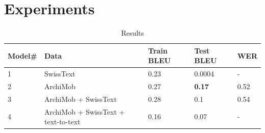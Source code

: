 \section{Experiments}
\begin{table}[!t]
    \centering
    \begin{tabular}{lllll}
    \hline\textbf{Model\#}    & \textbf{Data} & \textbf{Train BLEU}   & \textbf{Test BLEU}  & \textbf{WER}  \\\hline
    1                   & SwissText     & 0.23                  &  0.0004 & -              \\
    2                   & ArchiMob      & 0.27                  & \textbf{0.17}             & 0.52             \\
    3                   & ArchiMob + SwissText      & 0.28                  & 0.1                      & 0.54               \\
    4                   & ArchiMob + SwissText + text-to-text      & 0.16                  & 0.07                      & -              \\
    \hline
    \end{tabular}
    \caption{Results}
    \label{tab:Results}
\end{table}

